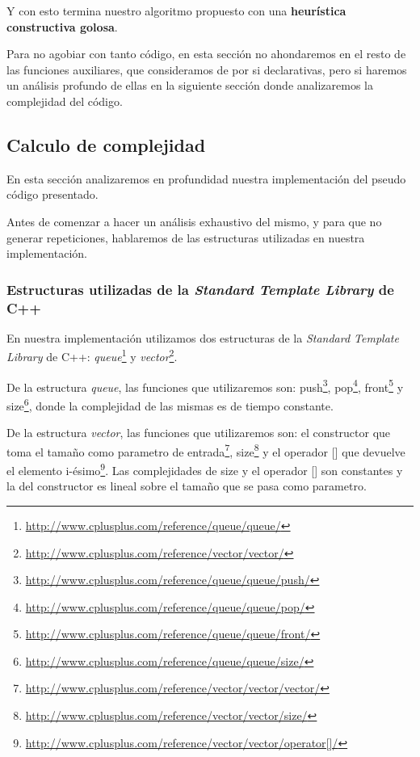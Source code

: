 Y con esto termina nuestro algoritmo propuesto con una \textbf{heurística constructiva golosa}.

Para no agobiar con tanto código, en esta sección no ahondaremos en el resto de las funciones auxiliares, que consideramos de por si declarativas, pero si haremos un análisis profundo de ellas en la siguiente sección donde analizaremos la complejidad del código.


\subsection{Calculo de complejidad}

En esta sección analizaremos en profundidad nuestra implementación del pseudo código presentado.

Antes de comenzar a hacer un análisis exhaustivo del mismo, y para que no generar repeticiones, hablaremos de las estructuras utilizadas en nuestra implementación.

\subsubsection{Estructuras utilizadas de la \textit{Standard Template Library} de C++}

En nuestra implementación utilizamos dos estructuras de la \textit{Standard Template Library} de C++: \emph{queue}\footnote{\url{http://www.cplusplus.com/reference/queue/queue/}} y \emph{vector}\footnote{\url{http://www.cplusplus.com/reference/vector/vector/}}.

De la estructura \emph{queue}, las funciones que utilizaremos son: push\footnote{\url{http://www.cplusplus.com/reference/queue/queue/push/}}, pop\footnote{\url{http://www.cplusplus.com/reference/queue/queue/pop/}}, front\footnote{\url{http://www.cplusplus.com/reference/queue/queue/front/}} y size\footnote{\url{http://www.cplusplus.com/reference/queue/queue/size/}}, donde la complejidad de las mismas es de tiempo constante.

De la estructura \emph{vector}, las funciones que utilizaremos son: el constructor que toma el tamaño como parametro de entrada\footnote{\url{http://www.cplusplus.com/reference/vector/vector/vector/}}, size\footnote{\url{http://www.cplusplus.com/reference/vector/vector/size/}} y el operador [] que devuelve el elemento i-ésimo\footnote{\url{http://www.cplusplus.com/reference/vector/vector/operator[]/}}. Las complejidades de size y el operador [] son constantes y la del constructor es lineal sobre el tamaño que se pasa como parametro.

